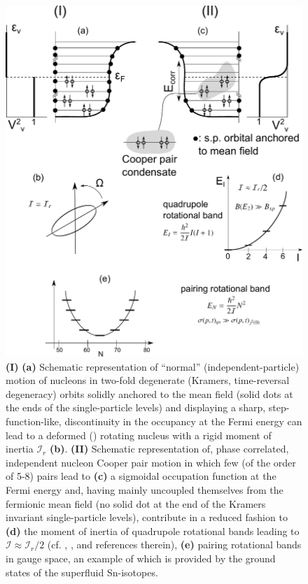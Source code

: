  
\begin{figure}
\centerline{\includegraphics*[width=\textwidth,angle=0]{nutshell/figs/fig1A3.pdf}}
\caption{\textbf{(I)} \textbf{(a)} Schematic representation of ``normal'' (independent-particle) motion of nucleons in  two-fold degenerate (Kramers, time-reversal degeneracy) orbits solidly anchored to the mean field (solid dots at the ends of the single-particle levels) and  displaying a sharp, step-function-like, discontinuity in the occupancy at the Fermi energy can lead to a deformed  (\cite{Nilsson:55}) rotating nucleus with a rigid moment of inertia $\mathcal{I}_r$ \textbf{(b)}. \textbf{(II)} Schematic representation of, phase correlated, independent nucleon Cooper pair  motion in which few (of the order of 5-8) pairs lead to \textbf{(c)} a sigmoidal occupation function at the Fermi energy and, having mainly uncoupled themselves from the fermionic mean field (no solid dot at the end of the Kramers invariant single-particle levels),    contribute in a reduced fashion to \textbf{(d)} the moment of inertia of quadrupole rotational bands leading to $\mathcal{I}\approx\mathcal{I}_r/2$ (cf. \cite{Belyaev:13}, \cite{Belyaev:59}, \cite{Bohr:75} and references therein), \textbf{(e)} pairing rotational bands in gauge space, an example of which is  provided by the ground states of the superfluid Sn-isotopes.}\label{fig1A3}
\end{figure}

